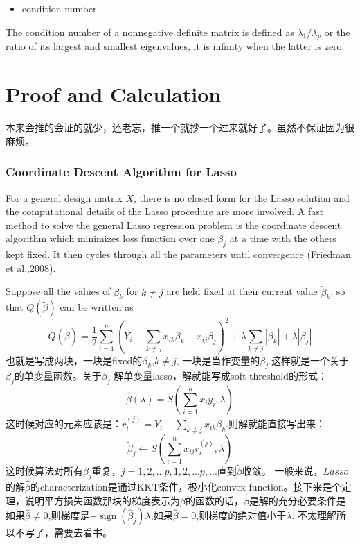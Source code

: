 \documentclass[
]{book}
\providecommand{\tightlist}{%
  \setlength{\itemsep}{0pt}\setlength{\parskip}{0pt}}
\theoremstyle{definition}
\theoremstyle{definition}
\theoremstyle{definition}
\theoremstyle{remark}
\begin{document}
\begin{itemize}
\tightlist
\item
  condition number
\end{itemize}

The condition number of a nonnegative definite matrix is defined as \(\lambda_1/\lambda_p\) or the ratio of its largest and smallest eigenvalues, it is infinity when the latter is zero.

\hypertarget{proof-and-calculation}{%
\chapter{Proof and Calculation}\label{proof-and-calculation}}

本来会推的会证的就少，还老忘，推一个就抄一个过来就好了。虽然不保证因为很麻烦。

\hypertarget{coordinate-descent-algorithm-for-lasso}{%
\subsection{Coordinate Descent Algorithm for Lasso}\label{coordinate-descent-algorithm-for-lasso}}

For a general design matrix \(X\), there is no closed form for the Lasso solution and the computational details of the Lasso procedure are more involved. A fast method to solve the general Lasso regression problem is the coordinate descent algorithm which minimizes loss function over one \(\beta_j\) at a time with the others kept fixed. It then cycles through all the parameters until convergence (Friedman et al.,2008).

Suppose all the values of \(\beta_k\) for \(k\neq j\) are held fixed at their current value \(\tilde \beta_k\), so that \(Q(\tilde\beta)\) can be written as
\[
Q(\tilde{\beta})=\frac{1}{2} \sum_{i=1}^{n}\left(Y_{i}-\sum_{k \neq j} x_{i k} \tilde{\beta}_{k}-x_{i j} \beta_{j}\right)^{2}+\lambda \sum_{k \neq j}\left|\tilde{\beta}_{k}\right|+\lambda\left|\beta_{j}\right|
\]
也就是写成两块，一块是fixed的\(\beta_k\),\(k\neq j\), 一块是当作变量的\(\beta_j\).这样就是一个关于\(\beta_j\)的单变量函数。关于\(\beta_j\) 解单变量lasso，解就能写成soft threshold的形式：
\[
\widehat{\beta}(\lambda)=S\left(\sum_{i=1}^{n} x_{i} y_{i}, \lambda\right)
\]
这时候对应的元素应该是：\(r_{i}^{(j)}=Y_{i}-\sum_{k \neq j} x_{i k} \tilde{\beta}_{k}\).则解就能直接写出来：
\[
\tilde{\beta}_{j} \leftarrow S\left(\sum_{i=1}^{n} x_{i j} r_{i}^{(j)}, \lambda\right)
\]
这时候算法对所有\(\beta_j\)重复，\(j=1,2,...p,1,2,...p,...\)直到\(\tilde \beta\)收敛。
一般来说，\(Lasso\)的解\(\hat\beta\)的characterization是通过KKT条件，极小化convex function。接下来是个定理，说明平方损失函数那块的梯度表示为\(\beta\)的函数的话，\(\hat\beta\)是解的充分必要条件是如果\(\hat\beta\neq 0\),则梯度是\(-\operatorname{sign}\left(\widehat{\beta}_{j}\right) \lambda\),如果\(\hat\beta=0\),则梯度的绝对值小于\(\lambda\).
不太理解所以不写了，需要去看书。

  
\end{document}
